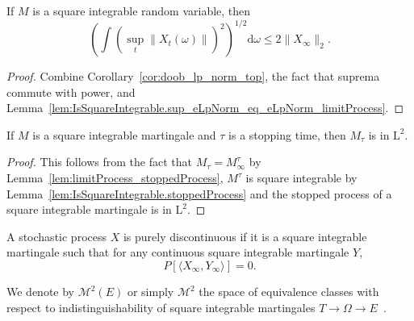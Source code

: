 \begin{lemma}\label{lem:IsSquareIntegrable.integral_iSup_norm_rpow_rpow_inv_le_limitProcess}
  \leanok
If $M$ is a square integrable random variable, then
$$\left(\int (\sup_t \|X_t(\omega)\|)^2\right)^{1/2} \mathrm d\omega \le 2 \|X_\infty\|_2.$$
\end{lemma}

\begin{proof}
  \leanok
Combine Corollary~\ref{cor:doob_lp_norm_top}, the fact that suprema commute with power, and Lemma~\ref{lem:IsSquareIntegrable.sup_eLpNorm_eq_eLpNorm_limitProcess}.
\end{proof}


\begin{lemma}\label{lem:memLp_two_stoppedValue}
  \leanok
If $M$ is a square integrable martingale and $\tau$ is a stopping time, then $M_\tau$ is in $\mathrm L^2$.
\end{lemma}

\begin{proof}
  \leanok
This follows from the fact that $M_\tau = M^\tau_\infty$ by Lemma~\ref{lem:limitProcess_stoppedProcess}, $M^\tau$ is square integrable by Lemma~\ref{lem:IsSquareIntegrable.stoppedProcess} and the stopped process of a square integrable martingale is in $\mathrm L^2$.
\end{proof}


\begin{definition}\label{def:IsPurelyDiscontinuous}
  \leanok
A stochastic process $X$ is purely discontinuous if it is a square integrable martingale such that for any continuous square integrable martingale $Y$,
$$P[\langle X_\infty, Y_\infty\rangle] = 0.$$
\end{definition}


\begin{definition}\label{def:L2Martingales}
  \leanok
We denote by $\mathcal{M}^2(E)$ or simply $\mathcal{M}^2$ the space of equivalence classes with respect to indistinguishability of square integrable martingales $T \to \Omega \to E$~.
\end{definition}


